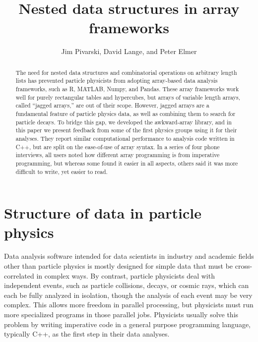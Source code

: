 \documentclass[a4paper]{jpconf}
\begin{document}
\title{Nested data structures in array frameworks}

\author{Jim Pivarski, David Lange, and Peter Elmer}

\address{Princeton University}


\begin{abstract}
The need for nested data structures and combinatorial operations on arbitrary length lists has prevented particle physicists from adopting array-based data analysis frameworks, such as R, MATLAB, Numpy, and Pandas. These array frameworks work well for purely rectangular tables and hypercubes, but arrays of variable length arrays, called ``jagged arrays,'' are out of their scope. However, jagged arrays are a fundamental feature of particle physics data, as well as combining them to search for particle decays. To bridge this gap, we developed the awkward-array library, and in this paper we present feedback from some of the first physics groups using it for their analyses. They report similar computational performance to analysis code written in C++, but are split on the ease-of-use of array syntax. In a series of four phone interviews, all users noted how different array programming is from imperative programming, but whereas some found it easier in all aspects, others said it was more difficult to write, yet easier to read.
\end{abstract}

\section{Structure of data in particle physics}

Data analysis software intended for data scientists in industry and academic fields other than particle physics is mostly designed for simple data that must be cross-correlated in complex ways. By contrast, particle physicists deal with independent events, such as particle collisions, decays, or cosmic rays, which can each be fully analyzed in isolation, though the analysis of each event may be very complex. This allows more freedom in parallel processing, but physicists must run more specialized programs in those parallel jobs. Physicists usually solve this problem by writing imperative code in a general purpose programming language, typically C++, as the first step in their data analyses.
\end{document}
